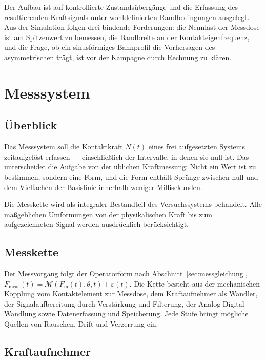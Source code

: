 \documentclass[12pt,a4paper]{report}
\begin{document}
Der Aufbau ist auf kontrollierte Zustandsübergänge und die Erfassung des
resultierenden Kraftsignals unter wohldefinierten Randbedingungen
ausgelegt. Aus der Simulation folgen drei bindende Forderungen: die
Nennlast der Messdose ist am Spitzenwert zu bemessen, die Bandbreite an
der Kontakteigenfrequenz, und die Frage, ob ein sinusförmiges Bahnprofil
die Vorhersagen des asymmetrischen trägt, ist vor der Kampagne durch
Rechnung zu klären.


\chapter{Messsystem}
\label{chap:messsystem}

\section{Überblick}

Das Messsystem soll die Kontaktkraft $N(t)$ eines frei aufgesetzten
Systems zeitaufgelöst erfassen --- einschließlich der Intervalle, in
denen sie null ist. Das unterscheidet die Aufgabe von der üblichen
Kraftmessung: Nicht ein Wert ist zu bestimmen, sondern eine Form, und
die Form enthält Sprünge zwischen null und dem Vielfachen der
Basislinie innerhalb weniger Millisekunden.

Die Messkette wird als integraler Bestandteil des Versuchssystems
behandelt. Alle maßgeblichen Umformungen von der physikalischen Kraft
bis zum aufgezeichneten Signal werden ausdrücklich berücksichtigt.

\section{Messkette}

Der Messvorgang folgt der Operatorform nach
Abschnitt~\ref{sec:messgleichung},
$F_{\mathrm{meas}}(t) = \mathcal{M}(F_{\mathrm{in}}(t), \theta, t) + \varepsilon(t)$.
Die Kette besteht aus der mechanischen Kopplung vom Kontaktelement zur
Messdose, dem Kraftaufnehmer als Wandler, der Signalaufbereitung durch
Verstärkung und Filterung, der Analog-Digital-Wandlung sowie
Datenerfassung und Speicherung. Jede Stufe bringt mögliche Quellen von
Rauschen, Drift und Verzerrung ein.

\section{Kraftaufnehmer}
\end{document}
